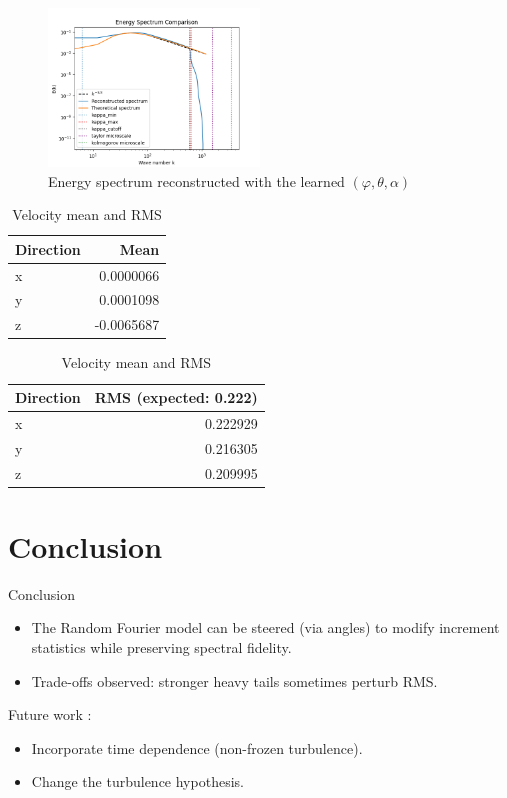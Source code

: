 \documentclass[11pt]{beamer}
\begin{document}
\begin{frame}
  \begin{figure}
    \centering
    \includegraphics[width=0.5\textwidth]{illustrations/EnerSpectAnglesRMS.png}
    \caption{Energy spectrum reconstructed with the learned $(\varphi,\theta,\alpha)$}
  \end{figure}

   \begin{table}
    \centering
    \begin{tabular}{lr}
      \toprule
      \textbf{Direction} & \textbf{Mean} \\
      \midrule
      x & 0.0000066 \\
      y & 0.0001098\\
      z & -0.0065687 \\
      \bottomrule
    \end{tabular}
    \qquad
    \begin{tabular}{lr}
      \toprule
      \textbf{Direction} & \textbf{RMS (expected: 0.222)} \\
      \midrule
      x & 0.222929 \\
      y & 0.216305 \\
      z & 0.209995 \\
      \bottomrule
    \end{tabular}
    \caption{Velocity mean and RMS}
  \end{table}
\end{frame}

\section{Conclusion}

\begin{frame}{Conclusion}
  \begin{itemize}
    \item The Random Fourier model can be steered (via angles) to modify increment statistics while preserving spectral fidelity.
    \item Trade-offs observed: stronger heavy tails sometimes perturb RMS.
  \end{itemize}

  Future work : 
  \begin{itemize}
    \item Incorporate time dependence (non-frozen turbulence).
    \item Change the turbulence hypothesis.
  \end{itemize}
\end{frame}

\end{document}
